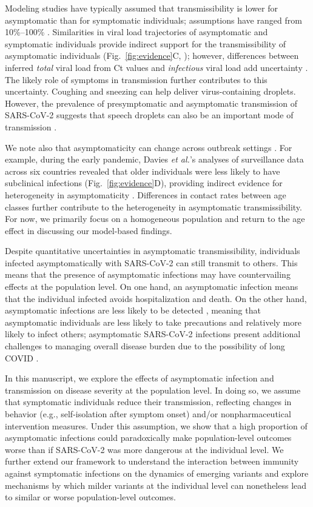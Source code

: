 \documentclass[12pt]{article}
\newcommand{\fref}[1]{Fig.~\ref{fig:#1}}
\begin{document}
Modeling studies have typically assumed that transmissibility is lower for asymptomatic than for symptomatic individuals; assumptions have ranged from 10\%--100\% \cite{ferretti2020quantifying,lavezzo2020}.
Similarities in viral load trajectories of asymptomatic and symptomatic individuals provide indirect support for the transmissibility of asymptomatic individuals (\fref{evidence}C, \cite{Kissler2020}); 
however, differences between inferred \emph{total} viral load from Ct values and \emph{infectious} viral load add uncertainty \cite{romero2021ct}.
The likely role of symptoms in transmission further contributes to this uncertainty.
Coughing and sneezing can help deliver virus-containing droplets. However, the prevalence of presymptomatic and asymptomatic transmission of SARS-CoV-2 suggests that speech droplets can also be an important mode of transmission \citep{stadnytskyi2021breathing}.

We note also that asymptomaticity can change across outbreak settings \cite{alene2021magnitude}.
For example, during the early pandemic, Davies \textit{et al.}'s analyses of surveillance data across six countries revealed that older individuals were less likely to have subclinical infections (\fref{evidence}D), providing indirect evidence for heterogeneity in asymptomaticity \cite{davies2020}.
Differences in contact rates between age classes further contribute to the heterogeneity in asymptomatic transmissibility.
For now, we primarily focus on a homogeneous population and return to the age effect in discussing our model-based findings.

Despite quantitative uncertainties in asymptomatic transmissibility, individuals infected asymptomatically with SARS-CoV-2 can still transmit to others. 
This means that the presence of asymptomatic infections may have countervailing effects at the population level. 
On one hand, an asymptomatic infection means that the individual infected avoids hospitalization and death. 
On the other hand, asymptomatic infections are less likely to be detected \cite{fraser2004factors,moghadas2020implications}, meaning that asymptomatic individuals are less likely to take precautions and relatively more likely to infect others;
asymptomatic SARS-CoV-2 infections present additional challenges to managing overall disease burden due to the possibility of long COVID \cite{xie2022long}.

In this manuscript, we explore the effects of asymptomatic infection and transmission on disease severity at the population level.
In doing so, we assume that symptomatic individuals reduce their transmission, reflecting changes in behavior (e.g., self-isolation after symptom onset) and/or nonpharmaceutical intervention measures.
Under this assumption, we show that a high proportion of asymptomatic infections could paradoxically make population-level outcomes worse than if SARS-CoV-2 was more dangerous at the individual level.
We further extend our framework to understand the interaction between immunity against symptomatic infections on the dynamics of emerging variants and explore mechanisms by which milder variants at the individual level can nonetheless lead to similar or worse population-level outcomes.
\end{document}
